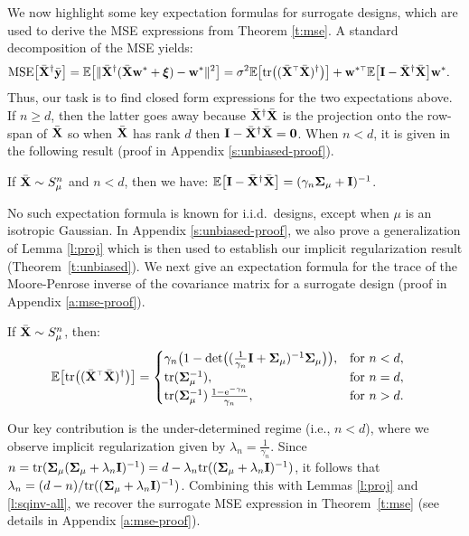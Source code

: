 \documentclass[11pt]{article}
\begin{document}
We now highlight some key expectation formulas for surrogate designs, which are used to
derive the MSE expressions from Theorem \ref{t:mse}. A standard decomposition of
the MSE yields:%
\begin{align}
  \MSE{\Xb^\dagger\ybb}
  &= \E\big[\|\Xb^\dagger(\Xb\w^*+\xib)-\w^*\|^2\big]
  =\sigma^2\E\big[\tr\big((\Xb^\top\Xb)^{\dagger}\big)\big] +
    \w^{*\top}\E\big[\I-\Xb^\dagger\Xb\big]\w^*.\label{eq:mse-derivation}
\end{align}
Thus, our task is to find closed form expressions for the two
expectations above. If $n\geq d$, then the latter goes away because
${\bar{\mathbf X}}^\dagger{\bar{\mathbf X}}$ is the projection onto the row-span of ${\bar{\mathbf X}}$ so
when ${\bar{\mathbf X}}$ has rank $d$ then $\mathbf I-{\bar{\mathbf X}}^\dagger{\bar{\mathbf X}}=\mathbf 0$. When
$n<d$, it is given in the following result (proof in
Appendix \ref{s:unbiased-proof}).
\begin{lemma}\label{l:proj}
If  ${\bar{\mathbf X}}\sim S_\mu^n$ and $n<d$, then we have:
$\mathbb E\big[\mathbf I-{\bar{\mathbf X}}^\dagger{\bar{\mathbf X}}\big] = (\gamma_n\mathbf{\Sigma}_\mu+\mathbf I)^{-1}$.
\end{lemma}

\noindent
No such expectation formula is known for i.i.d.~designs, except when
$\mu$ is an isotropic Gaussian. In Appendix \ref{s:unbiased-proof}, we
also prove a generalization of Lemma \ref{l:proj} which is then used
to establish our implicit regularization result
(Theorem~\ref{t:unbiased}). We next give an expectation formula 
for the trace of the Moore-Penrose inverse of the covariance
matrix for a surrogate design (proof in Appendix \ref{a:mse-proof}).
\begin{lemma}\label{l:sqinv-all}
If  ${\bar{\mathbf X}}\sim S_\mu^n$, then:\vspace{-2mm}
\begin{align*}
    \E\big[\tr\big((\Xb^\top\Xb)^{\dagger}\big)\big]
  &=
    \begin{cases}
\gamma_n\big(1-
\det\!\big((\tfrac1{\gamma_n}\I+\Sigmab_\mu)^{-1}\Sigmab_\mu\big)\big),
&\text{for }n<d,\\
\tr(\Sigmab_\mu^{-1}),
&\text{for }n=d,\\
\tr(\Sigmab_\mu^{-1})\,\frac{1-\ee^{-\gamma_n}}{\gamma_n},
&\text{for }n>d.
\end{cases}
\end{align*}
\end{lemma}

\noindent
Our key contribution is the under-determined
regime (i.e., $n<d$), where we observe implicit regularization
given by $\lambda_n=\frac1{\gamma_n}$. Since $n =
\mathrm{tr}(\mathbf{\Sigma}_\mu(\mathbf{\Sigma}_\mu+\lambda_n\mathbf I)^{-1})=d-\lambda_n\mathrm{tr}((\mathbf{\Sigma}_\mu+\lambda_n\mathbf I)^{-1})$,
it follows that $\lambda_n=(d-n)/\mathrm{tr}((\mathbf{\Sigma}_\mu+\lambda_n\mathbf I)^{-1})$.
Combining this with Lemmas \ref{l:proj} and \ref{l:sqinv-all}, we
recover the surrogate MSE expression in Theorem~\ref{t:mse} (see details
in Appendix \ref{a:mse-proof}).
\end{document}

